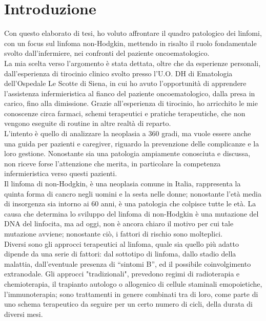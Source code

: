 \section*{Introduzione}
   
Con questo elaborato di tesi, ho voluto affrontare il quadro patologico dei linfomi, con un focus sul linfoma non-Hodgkin, 
mettendo in risalto il ruolo fondamentale svolto dall'infermiere, nei confronti del paziente oncoematologico.\\
La mia scelta verso l'argomento è stata dettata, oltre che da esperienze personali, dall'esperienza di tirocinio clinico 
svolto presso l'U.O. DH di Ematologia dell'Ospedale Le Scotte di Siena, in cui ho avuto l'opportunità di apprendere 
l'assistenza infermieristica al fianco del paziente oncoematologico, dalla presa in carico, fino alla dimissione. 
Grazie all'esperienza di tirocinio, ho arricchito le mie conoscenze circa farmaci, 
schemi terapeutici e pratiche terapeutiche, che non vengono eseguite di routine in altre realtà di reparto.\\ 
L'intento è quello di analizzare la neoplasia a 360 gradi, ma vuole essere anche 
una guida per pazienti e caregiver, riguardo la prevenzione delle 
complicanze e la loro gestione. Nonostante sia una patologia ampiamente conosciuta e discussa,
non riceve forse l'attenzione che merita, in particolare la competenza infermieristica verso questi pazienti.\\
Il linfoma di non-Hodgkin, è una neoplasia comune in Italia, rappresenta la quinta forma di cancro negli uomini e la 
sesta nelle donne; nonostante l'età media di insorgenza sia intorno ai 60 anni, è una patologia che colpisce tutte 
le età. La causa che determina lo sviluppo del linfoma di non-Hodgkin è una mutazione del DNA del linfocita, ma ad 
oggi, non è ancora chiaro il motivo per cui tale mutazione avviene; nonostante ciò, i fattori di rischio sono molteplici.\\
Diversi sono gli approcci terapeutici al linfoma, quale sia quello più adatto dipende da una serie di fattori:
dal sottotipo di linfoma, dallo stadio della malattia, dall’eventuale presenza di “sintomi B”, ed il possibile 
coinvolgimento extranodale. Gli approcci "tradizionali", prevedono regimi di radioterapia e chemioterapia,
il trapianto autologo o allogenico di cellule staminali emopoietiche, l'immunoterapia; sono trattamenti in genere 
combinati tra di loro, come parte di uno schema terapeutico da seguire per un certo numero di cicli, 
della durata di diversi mesi.\\
